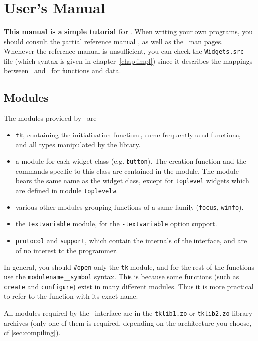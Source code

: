 \chapter{User's Manual}
{\bf This manual is a simple tutorial for \caml\tk }.  When writing your own
programs, you should consult the partial reference manual , as well as the
\tk\ man pages.  Whenever the reference manual is unsufficient, you can
check the \verb|Widgets.src| file (which syntax is given in
chapter~\ref{chap:impl}) since it describes the mappings between
\tk\ and \caml\ for functions and data. 

\section{Modules}
The modules provided by \caml\tk\ are

\begin{itemize}
\item \verb|tk|, containing the initialisation functions, some frequently
used functions, and all types manipulated by the library.

\item a module for each widget class (e.g. \verb|button|). The creation
function and the commands specific to this class are contained in the
module. The module bears the same name as the widget class, except for
\verb|toplevel| widgets which are defined in module \verb|toplevelw|.

\item various other modules grouping functions of a same family
(\verb|focus|, \verb|winfo|). 

\item the \verb|textvariable| module, for the \verb|-textvariable| option
support.

\item \verb|protocol| and \verb|support|, which contain the internals
of the interface, and are of no interest to the programmer.
\end{itemize} 

In general, you should \verb|#open| only the \verb|tk| module, and for the
rest of the functions use the \verb|modulename__symbol| syntax.
This is because some functions (such as \verb|create| and \verb|configure|)
exist in many different modules. Thus it is more practical to refer to the
function with its exact name.

All modules required by the \tk\ interface are in the \verb|tklib1.zo| or
\verb|tklib2.zo| library archives (only one of them is required, depending
on the architecture you choose, cf \ref{sec:compiling}).

